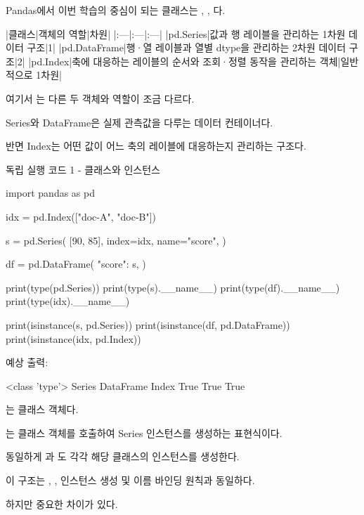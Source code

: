 Pandas에서 이번 학습의 중심이 되는 클래스는 , , 다.

\begin{dhktable}
|클래스|객체의 역할|차원|
|:---|:---|:---|
|pd.Series|값과 행 레이블을 관리하는 1차원 데이터 구조|1|
|pd.DataFrame|행·열 레이블과 열별 dtype을 관리하는 2차원 데이터 구조|2|
|pd.Index|축에 대응하는 레이블의 순서와 조회·정렬 동작을 관리하는 객체|일반적으로 1차원|
\end{dhktable}

여기서 는 다른 두 객체와 역할이 조금 다르다.

Series와 DataFrame은 실제 관측값을 다루는 데이터 컨테이너다.

반면 Index는 어떤 값이 어느 축의 레이블에 대응하는지 관리하는 구조다.

\begin{dhknote}
\begin{dhksmry}[centered]
독립 실행 코드 1 - 클래스와 인스턴스
\end{dhksmry}
\end{dhknote}

\begin{dhkcode}
import pandas as pd

idx = pd.Index(["doc-A", "doc-B"])

s = pd.Series(
    [90, 85],
    index=idx,
    name="score",
)

df = pd.DataFrame({
    "score": s,
})

print(type(pd.Series))
print(type(s).__name__)
print(type(df).__name__)
print(type(idx).__name__)

print(isinstance(s, pd.Series))
print(isinstance(df, pd.DataFrame))
print(isinstance(idx, pd.Index))
\end{dhkcode}

예상 출력:

\begin{dhkzsh}
<class 'type'>
Series
DataFrame
Index
True
True
True
\end{dhkzsh}

는 클래스 객체다.

는 클래스 객체를 호출하여 Series 인스턴스를 생성하는 표현식이다.

동일하게 과 도 각각 해당 클래스의 인스턴스를 생성한다.

이 구조는 , , 인스턴스 생성 및 이름 바인딩 원칙과 동일하다.

하지만 중요한 차이가 있다.

